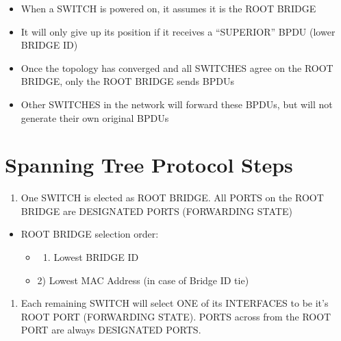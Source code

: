 \begin{itemize}
\tightlist
\item
  When a SWITCH is powered on, it assumes it is the ROOT BRIDGE
\item
  It will only give up its position if it receives a ``SUPERIOR'' BPDU
  (lower BRIDGE ID)
\item
  Once the topology has converged and all SWITCHES agree on the ROOT
  BRIDGE, only the ROOT BRIDGE sends BPDUs
\item
  Other SWITCHES in the network will forward these BPDUs, but will not
  generate their own original BPDUs
\end{itemize}

\section{Spanning Tree Protocol
Steps}\label{spanning-tree-protocol-steps}

\begin{enumerate}
\def\labelenumi{\arabic{enumi})}
\tightlist
\item
  One SWITCH is elected as ROOT BRIDGE. All PORTS on the ROOT BRIDGE are
  DESIGNATED PORTS (FORWARDING STATE)
\end{enumerate}

\begin{itemize}
\tightlist
\item
  ROOT BRIDGE selection order:

  \begin{itemize}
  \tightlist
  \item
    \begin{enumerate}
    \def\labelenumi{\arabic{enumi})}
    \tightlist
    \item
      Lowest BRIDGE ID
    \end{enumerate}
  \item
    2) Lowest MAC Address (in case of Bridge ID tie)
  \end{itemize}
\end{itemize}

\begin{enumerate}
\def\labelenumi{\arabic{enumi})}
\setcounter{enumi}{1}
\tightlist
\item
  Each remaining SWITCH will select ONE of its INTERFACES to be it's
  ROOT PORT (FORWARDING STATE). PORTS across from the ROOT PORT are
  always DESIGNATED PORTS.
\end{enumerate}

